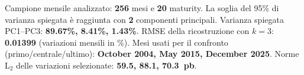 Campione mensile analizzato: \textbf{256} mesi e \textbf{20} maturity.
La soglia del 95\% di varianza spiegata \`e raggiunta con \textbf{2} componenti principali.
Varianza spiegata PC1--PC3: \textbf{89.67\%, 8.41\%, 1.43\%}.
RMSE della ricostruzione con $k=3$: \textbf{0.01399} (variazioni mensili in \%).
Mesi usati per il confronto (primo/centrale/ultimo): \textbf{October 2004, May 2015, December 2025}.
Norme L$_2$ delle variazioni selezionate: \textbf{59.5, 88.1, 70.3~pb}.
